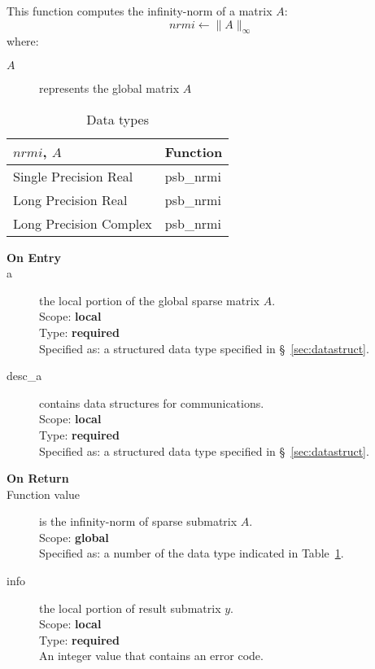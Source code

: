 %
%



This function computes the infinity-norm of a matrix $A$:\\

\[ nrmi \leftarrow \|A\|_\infty \]
where:
\begin{description}
\item[$A$] represents the global matrix $A$
\end{description}

\begin{table}[h]
\begin{center}
\begin{tabular}{ll}
\hline
$nrmi$, $A$ & {\bf Function}\\
\hline
Single Precision Real & psb\_nrmi\\
Long Precision Real & psb\_nrmi \\
Long Precision Complex & psb\_nrmi \\
\hline
\end{tabular}
\end{center}
\caption{Data types\label{tab:f90nrmi}}
\end{table}


\begin{description}
\item[\bf On Entry]
\item[a] the local  portion of the global sparse matrix
$A$. \\   
Scope: {\bf local} \\
Type: {\bf required}\\
Specified as: a structured data type specified in
\S~\ref{sec:datastruct}.
\item[desc\_a] contains data structures for communications.\\
Scope: {\bf local} \\
Type: {\bf required}\\
Specified as: a structured data type specified in
\S~\ref{sec:datastruct}.
\item[\bf On Return] 
\item[Function value] is the infinity-norm of sparse submatrix $A$.\\
Scope: {\bf global} \\
Specified as: a number of the data type indicated in Table~\ref{tab:f90nrmi}.
\item[info] the local portion of result submatrix $y$.\\
Scope: {\bf local} \\
Type: {\bf required} \\
An integer value that contains an error code. 
\end{description}


